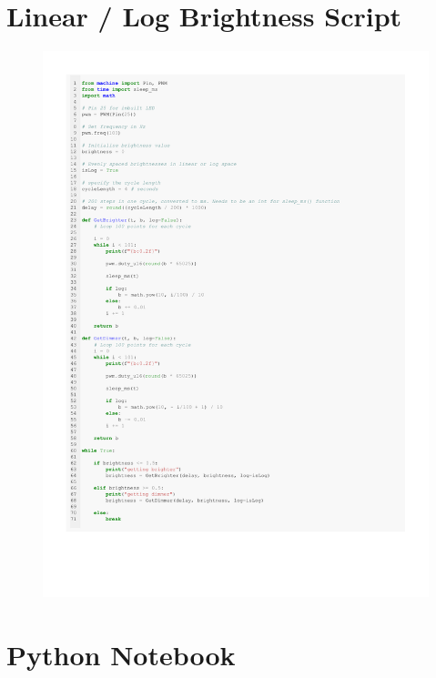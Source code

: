 \documentclass[%
 reprint,
 amsmath,amssymb,
 aps,
]{revtex4-2}
\begin{document}
\section{Linear / Log Brightness Script}
    \begin{figure}[h]
        \includegraphics[width=\columnwidth]{Images/linearLogBrightness.pdf}
    \end{figure}


\clearpage
\section{Python Notebook}
\end{document}
